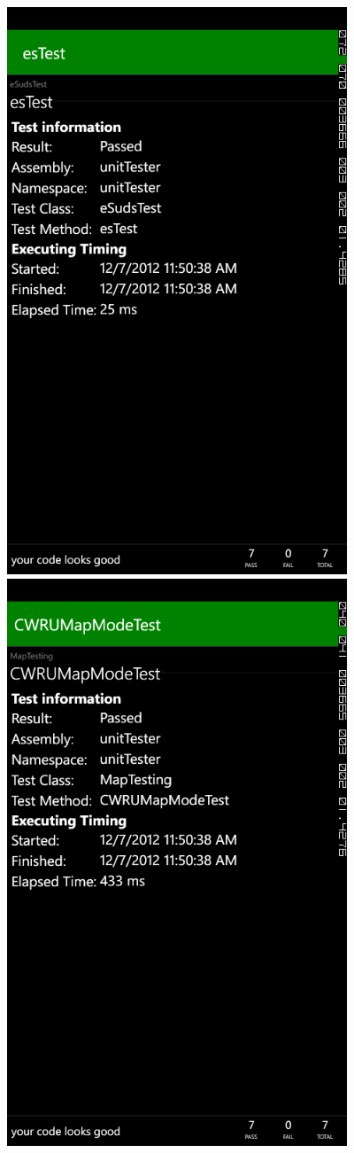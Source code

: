 \documentclass[pdftex,12pt,letter]{article}
\begin{document}
\FloatBarrier
\includegraphics[width=4in]{ss6.png}
\FloatBarrier
\includegraphics[width=4in]{ss7.png}
\end{document}
